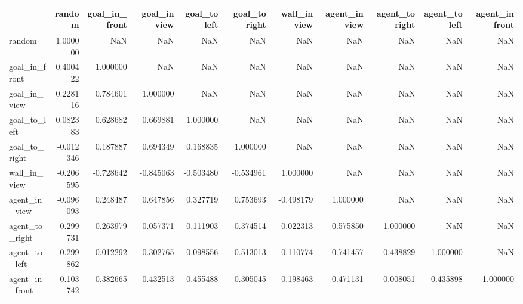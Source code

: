 \begin{tabular}{lrrrrrrrrrr}
\toprule
\toprule
\midrule
 & random & goal\_in\_front & goal\_in\_view & goal\_to\_left & goal\_to\_right & wall\_in\_view & agent\_in\_view & agent\_to\_right & agent\_to\_left & agent\_in\_front \\
\midrule
random & 1.000000 & NaN & NaN & NaN & NaN & NaN & NaN & NaN & NaN & NaN \\
goal\_in\_front & 0.400422 & 1.000000 & NaN & NaN & NaN & NaN & NaN & NaN & NaN & NaN \\
goal\_in\_view & 0.228116 & 0.784601 & 1.000000 & NaN & NaN & NaN & NaN & NaN & NaN & NaN \\
goal\_to\_left & 0.082383 & 0.628682 & 0.669881 & 1.000000 & NaN & NaN & NaN & NaN & NaN & NaN \\
goal\_to\_right & -0.012346 & 0.187887 & 0.694349 & 0.168835 & 1.000000 & NaN & NaN & NaN & NaN & NaN \\
wall\_in\_view & -0.206595 & -0.728642 & -0.845063 & -0.503480 & -0.534961 & 1.000000 & NaN & NaN & NaN & NaN \\
agent\_in\_view & -0.096093 & 0.248487 & 0.647856 & 0.327719 & 0.753693 & -0.498179 & 1.000000 & NaN & NaN & NaN \\
agent\_to\_right & -0.299731 & -0.263979 & 0.057371 & -0.111903 & 0.374514 & -0.022313 & 0.575850 & 1.000000 & NaN & NaN \\
agent\_to\_left & -0.299862 & 0.012292 & 0.302765 & 0.098556 & 0.513013 & -0.110774 & 0.741457 & 0.438829 & 1.000000 & NaN \\
agent\_in\_front & -0.103742 & 0.382665 & 0.432513 & 0.455488 & 0.305045 & -0.198463 & 0.471131 & -0.008051 & 0.435898 & 1.000000 \\
\bottomrule
\bottomrule
\end{tabular}